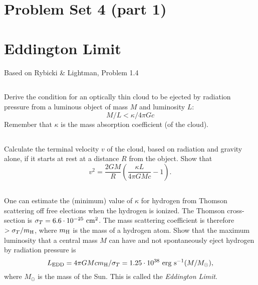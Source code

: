 \documentclass[11pt]{article}
\begin{document}
\pagestyle{empty}
\parindent=0pt

\section*{\centering Problem Set 4 (part 1)}

\section{Eddington Limit}

Based on Rybicki \& Lightman, Problem 1.4

\subsection{}
Derive the condition for an optically thin cloud to be ejected by radiation
pressure from a luminous object of mass $M$ and luminosity $L$:
\begin{equation}
M/L < \kappa/4\pi Gc
\end{equation}
Remember that $\kappa$ is the mass absorption coefficient (of the cloud).

\subsection{}
Calculate the terminal velocity $v$ of the cloud, based on radiation and
gravity alone, if it starts at rest at a distance $R$ from the object.  Show that
\begin{equation}
v^2=\frac{2GM}{R}\left(\frac{\kappa L}{4\pi GMc}-1\right).
\end{equation}

\subsection{}
One can estimate the (minimum) value of $\kappa$ for hydrogen from
Thomson scattering off free elections when the hydrogen is ionized.
The Thomson cross-section is $\sigma_T=6.6\cdot10^{-25}~{\rm cm}^2$.
The mass scattering coefficient is therefore $>\sigma_T/m_{\rm H}$,
where $m_{\rm H}$ is the mass of a hydrogen atom.  Show that the maximum
luminosity that a central mass $M$ can have and not spontaneously eject
hydrogen by radiation pressure is
\begin{equation}
L_{\rm EDD}=4\pi GMcm_{\rm H}/\sigma_T = 1.25\cdot10^{38}~{\rm erg}~{\rm s}^{-1} (M/M_\odot),
\end{equation}
where $M_\odot$ is the mass of the Sun.  This is called the {\it Eddington Limit}.
\end{document}
